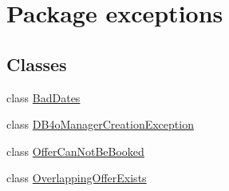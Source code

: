 \hypertarget{namespaceexceptions}{}\section{Package exceptions}
\label{namespaceexceptions}
\subsection*{Classes}
\begin{DoxyCompactItemize}
\item 
class \mbox{\hyperlink{classexceptions_1_1BadDates}{Bad\+Dates}}
\item 
class \mbox{\hyperlink{classexceptions_1_1DB4oManagerCreationException}{D\+B4o\+Manager\+Creation\+Exception}}
\item 
class \mbox{\hyperlink{classexceptions_1_1OfferCanNotBeBooked}{Offer\+Can\+Not\+Be\+Booked}}
\item 
class \mbox{\hyperlink{classexceptions_1_1OverlappingOfferExists}{Overlapping\+Offer\+Exists}}
\end{DoxyCompactItemize}

